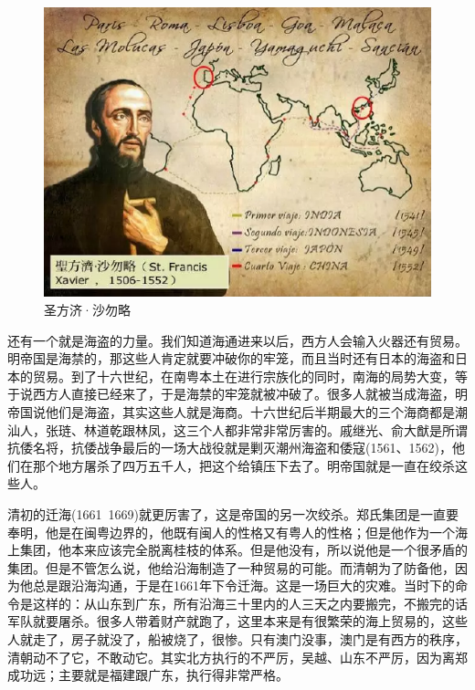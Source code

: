 \begin{figure}
	\centering
	\includegraphics[width=\textwidth]{images/image-63}
	\caption{圣方济·沙勿略}
\end{figure}

还有一个就是海盗的力量。我们知道海通进来以后，西方人会输入火器还有贸易。明帝国是海禁的，那这些人肯定就要冲破你的牢笼，而且当时还有日本的海盗和日本的贸易。到了十六世纪，在南粤本土在进行宗族化的同时，南海的局势大变，等于说西方人直接已经来了，于是海禁的牢笼就被冲破了。很多人就被当成海盗，明帝国说他们是海盗，其实这些人就是海商。十六世纪后半期最大的三个海商都是潮汕人，张琏、林道乾跟林凤，这三个人都非常非常厉害的。戚继光、俞大猷是所谓抗倭名将，抗倭战争最后的一场大战役就是剿灭潮州海盗和倭寇(1561、1562)，他们在那个地方屠杀了四万五千人，把这个给镇压下去了。明帝国就是一直在绞杀这些人。

清初的迁海(1661~1669)就更厉害了，这是帝国的另一次绞杀。郑氏集团是一直要奉明，他是在闽粤边界的，他既有闽人的性格又有粤人的性格；但是他作为一个海上集团，他本来应该完全脱离桂枝的体系。但是他没有，所以说他是一个很矛盾的集团。但是不管怎么说，他给沿海制造了一种贸易的可能。而清朝为了防备他，因为他总是跟沿海沟通，于是在1661年下令迁海。这是一场巨大的灾难。当时下的命令是这样的：从山东到广东，所有沿海三十里内的人三天之内要搬完，不搬完的话军队就要屠杀。很多人带着财产就跑了，这里本来是有很繁荣的海上贸易的，这些人就走了，房子就没了，船被烧了，很惨。只有澳门没事，澳门是有西方的秩序，清朝动不了它，不敢动它。其实北方执行的不严厉，吴越、山东不严厉，因为离郑成功远；主要就是福建跟广东，执行得非常严格。

